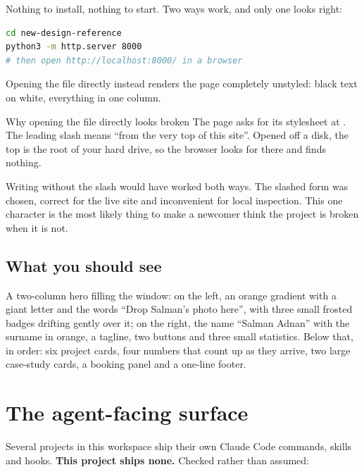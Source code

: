 \documentclass[11pt,a4paper]{article}
\begin{document}
Nothing to install, nothing to start. Two ways work, and only one looks right:

\begin{lstlisting}[language=bash,caption={The way that works properly}]
cd new-design-reference
python3 -m http.server 8000
# then open http://localhost:8000/ in a browser
\end{lstlisting}

Opening the file directly instead renders the page completely unstyled: black text
on white, everything in one column.

\begin{keyidea}{Why opening the file directly looks broken}
The page asks for its stylesheet at . The leading slash means
``from the very top of this site''. Opened off a disk, the top is the root of your
hard drive, so the browser looks for  there and finds nothing.

Writing  without the slash would have worked both ways. The
slashed form was chosen, correct for the live site and inconvenient for local
inspection. This one character is the most likely thing to make a newcomer think
the project is broken when it is not.
\end{keyidea}

\subsection{What you should see}

A two-column hero filling the window: on the left, an orange gradient with a giant
letter  and the words ``Drop Salman's photo here'', with three small
frosted badges drifting gently over it; on the right, the name ``Salman Adnan''
with the surname in orange, a tagline, two buttons and three small statistics.
Below that, in order: six project cards, four numbers that count up as they arrive,
two large case-study cards, a booking panel and a one-line footer.

\section{The agent-facing surface}

Several projects in this workspace ship their own Claude Code commands, skills and
hooks. \textbf{This project ships none.} Checked rather than assumed:
\end{document}
